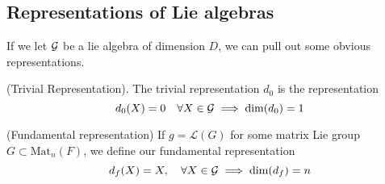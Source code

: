 \subsection{Representations of Lie algebras} 
If we let $ \mathcal{ G }$ be a lie algebra of 
dimension $ D $, we can pull out some obvious representations. 
\begin{defn}{(Trivial Representation).} 
	The trivial representation $ d_0 $ is the 
	representation 
	\[
		d_ 0 ( X )  = 0 \quad \forall X \in \mathcal{ G } \implies \dim ( d_0 ) = 1
	\] 
\end{defn}

\begin{defn}{(Fundamental representation)}
	If $ g   = \mathcal{ L } ( G ) $ for some
	matrix Lie group $ G \subset \text{Mat}_n ( F) $, we define our 
	fundamental representation 
	\[
	 d _ f ( X) = X, \quad \forall X \in \mathcal{ G } \implies \dim ( d_ f ) = n 
	\] 
\end{defn}

